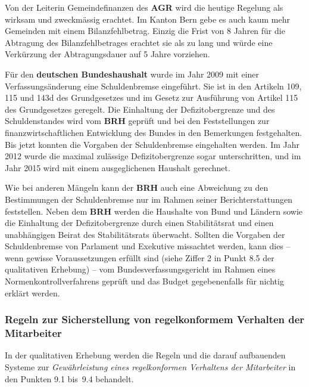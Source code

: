 \documentclass[10pt]{article}
\begin{document}
Von der Leiterin Gemeindefinanzen des \textbf{AGR} wird die heutige Regelung als wirksam und zweckmässig erachtet. Im Kanton Bern gebe es auch kaum mehr Gemeinden mit einem Bilanzfehlbetrag. Einzig die Frist von 8 Jahren für die Abtragung des Bilanzfehlbetrages erachtet sie als zu lang und würde eine Verkürzung der Abtragungsdauer auf 5 Jahre vorziehen. 

Für den \textbf{deutschen Bundeshaushalt} wurde im Jahr 2009 mit einer Verfassungs­änderung eine Schuldenbremse eingeführt. Sie ist in den Artikeln 109, 115 und 143d des Grundgesetzes und im Gesetz zur Ausführung von Artikel 115 des Grundgesetzes geregelt. Die Einhaltung der Defizitobergrenze und des Schuldenstandes wird vom \textbf{BRH} geprüft und bei den Feststellungen zur finanzwirtschaftlichen Entwicklung des Bundes in den Bemerkungen festgehalten. Bis jetzt konnten die Vorgaben der Schuldenbremse eingehalten werden. Im Jahr 2012 wurde die maximal zulässige Defizitobergrenze sogar unterschritten, und im Jahr 2015 wird mit einem ausgeglichenen Haushalt gerechnet.

Wie bei anderen Mängeln kann der \textbf{BRH} auch eine Abweichung zu den Bestimmungen der Schuldenbremse nur im Rahmen seiner Berichterstattungen feststellen. Neben dem \textbf{BRH} werden die Haushalte von Bund und Ländern sowie die Einhaltung der Defizitobergrenze durch einen Stabilitätsrat und einen unabhängigen Beirat des Stabilitätsrats überwacht. Sollten die Vorgaben der Schuldenbremse von Parlament und Exekutive missachtet werden, kann dies -- wenn gewisse Voraussetzungen erfüllt sind (siehe Ziffer 2 in Punkt 8.5 der qualitativen Erhebung) -- vom Bundesverfassungsgericht im Rahmen eines Normenkontrollverfahrens geprüft und das Budget gegebenenfalls für nichtig erklärt werden.

\subsubsection{Regeln zur Sicherstellung von regelkonformem Verhalten der Mitarbeiter}\label{subsubsec:regeln_zur_sicherstellung_von_regelkonformem_verhalten_der_mitarbeiter}
In der qualitativen Erhebung werden die Regeln und die darauf aufbauenden Systeme zur \textit{Gewährleistung eines regelkonformen Verhaltens der Mitarbeiter} in den Punkten 9.1 bis~9.4 behandelt.
\end{document}
